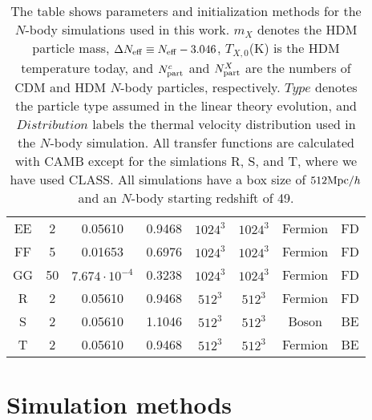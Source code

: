 \documentclass[11pt,a4paper]{article}
\renewcommand\({\left(}
\renewcommand\){\right)}
\renewcommand\[{\left[}
\renewcommand\]{\right]}
\begin{document}
\begin{table}[t]
\begin{center}
\begin{tabular}{c c c c c c c c}
          EE  &       2          &  0.05610                       &  0.9468        & $1024^3$                                & $1024^3$& Fermion & FD    \\
          FF &       5          &  0.01653                       &  0.6976        & $1024^3$                                & $1024^3$ & Fermion & FD   \\
          GG &       50         &  $7.674\cdot 10^{-4}$        &  0.3238        & $1024^3$                                & $1024^3$   & Fermion & FD  \\           
          R&       2            &  0.05610                      &  0.9468        & $512^3$                                 & $512^3$   & Fermion & FD \\
          S&       2            &  0.05610                      &  1.1046        & $512^3$                                 & $512^3$ & Boson & BE   \\
          T&       2            &  0.05610                      &  0.9468        & $512^3$                                 & $512^3$ & Fermion & BE   \\                                     \hline
      \end{tabular}
      \end{center}
          \caption{The table shows parameters and initialization methods for the $N$-body simulations used in this work.  $m_X$ denotes the HDM particle mass, $\Delta N_{\rm eff} \equiv N_{\rm eff}-3.046$, $T_{X,0}$(K) is the HDM temperature today, and $N_{\rm part}^c$ and $N_{\rm part}^X$ are the numbers of CDM and HDM $N$-body particles, respectively. $Type$ denotes the particle type assumed in the linear theory evolution, and $Distribution$ labels the thermal velocity distribution used in the $N$-body simulation. All transfer functions are calculated with CAMB except for the simlations R, S, and T, where we have used CLASS. All simulations have a box size of $512 {\rm Mpc} / h$ and an $N$-body starting redshift of 49.} 
      \label{table:nbody_sims} 
\end{table}
\section{Simulation methods} \label{sec:methods}
\end{document}
